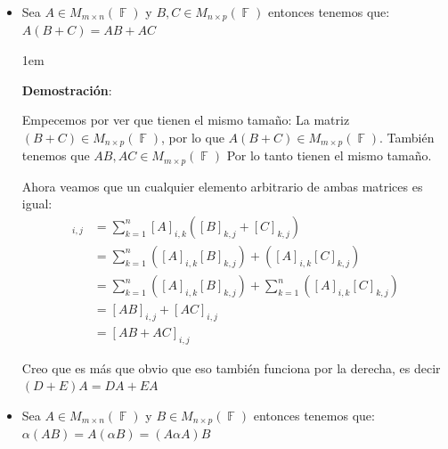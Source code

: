 \documentclass[12pt, fleqn]{report}                             %
\newenvironment{SmallIndentation}[1][0.75em]                    %
        {\begin{adjustwidth}{#1}{}\begin{footnotesize}}             %
        {\end{footnotesize}\end{adjustwidth}}                       %
\theoremstyle{break}                                            %
\DeclareMathOperator \GenericField {\mathbb{F}}                 %
\begin{document}
                \begin{itemize}

                    \item
                        Sea $A \in M_{m \times n}(\GenericField)$ y $B,C \in M_{n \times p}(\GenericField)$
                        entonces tenemos que:
                        $A(B + C) = AB + AC$

                        \begin{SmallIndentation}[1em]
                            \textbf{Demostración}:

                            Empecemos por ver que tienen el mismo tamaño:
                            La matriz $(B+C) \in M_{n \times p}(\GenericField)$, por lo que 
                            $A(B+C) \in M_{m \times p}(\GenericField)$.
                            También tenemos que $AB, AC \in M_{m \times p}(\GenericField)$
                            Por lo tanto tienen el mismo tamaño.

                            Ahora veamos que un cualquier elemento arbitrario de ambas matrices es igual:
                            \begin{align*}
                                [ A (B + C) ]_{i, j}    
                                    &= \sum_{k = 1}^n  [A]_{i, k} ([B]_{k, j} + [C]_{k, j})                 \\
                                    &= \sum_{k = 1}^n ([A]_{i, k} [B]_{k, j}) + ([A]_{i, k} [C]_{k, j})     \\
                                    &= \sum_{k = 1}^n ([A]_{i, k} [B]_{k, j}) 
                                        +
                                       \sum_{k = 1}^n ([A]_{i, k} [C]_{k, j})                               \\
                                    &= [AB]_{i, j} + [AC]_{i, j}                                            \\
                                    &= [AB + AC]_{i, j}
                            \end{align*}

                            Creo que es más que obvio que eso también funciona por la derecha, es decir
                            $(D + E)A = DA + EA$

                        \end{SmallIndentation}

                    \item
                        Sea $A \in M_{m \times n}(\GenericField)$ y $B \in M_{n \times p}(\GenericField)$
                        entonces tenemos que: $\alpha(AB) = A(\alpha B) = (A\alpha A) B$


\end{itemize}
\end{document}
